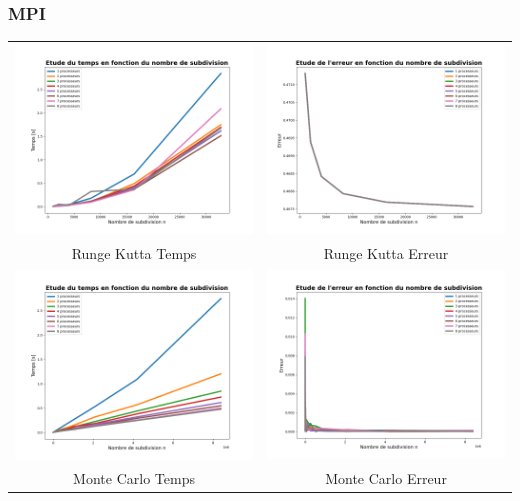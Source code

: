 \documentclass[10pt]{beamer}
\begin{document}
\begin{frame}
    \frametitle{MPI}
        \small
    \begin{tabular}{cc}
        \includegraphics[width=0.45\linewidth]{Images/time_RK_MPI.png} &
        \includegraphics[width=0.45\linewidth]{Images/error_RK_MPI.png} \\
        Runge Kutta Temps & Runge Kutta Erreur \\
        \includegraphics[width=0.45\linewidth]{Images/time_montecarlo_MPI.png} &
        \includegraphics[width=0.45\linewidth]{Images/error_montecarlo_MPI.png} \\
        Monte Carlo Temps & Monte Carlo Erreur\\
    \end{tabular}
        
\end{frame}
\end{document}
